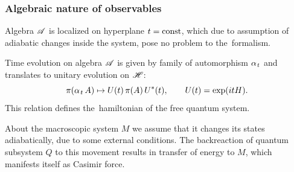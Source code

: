 \documentclass[10pt,t]{beamer}
\begin{document}
\begin{frame}
  \frametitle{Algebraic nature of observables}


  Algebra $\mathcal{A}$ is localized on hyperplane $t = \textrm{const}$, which due to
  assumption of adiabatic changes inside the system, pose no problem to
  the~formalism.

  Time evolution on algebra $\mathcal{A}$ is given by family of automorphism
  $\alpha_{ \hspace{0.09em} t }$ and translates to unitary evolution on $\mathcal{H}$:
  \begin{equation}
    \label{eq:Overview-of-Herdegens-approach-ETC-02}
    \pi( \alpha_{ \hspace{0.09em} t } \, A ) \mapsto U( t ) \, \pi( A ) \, U^{ * }( t ), \qquad
    U( t ) = \exp( i t H ).
  \end{equation}
  This relation defines the~hamiltonian of the free quantum system.

  About the macroscopic system $M$ we assume that it changes its states
  adiabatically, due to some external conditions. The backreaction of
  quantum subsystem $Q$ to this movement results in transfer of energy to
  $M$, which manifests itself as Casimir force.


\end{frame}
\end{document}
